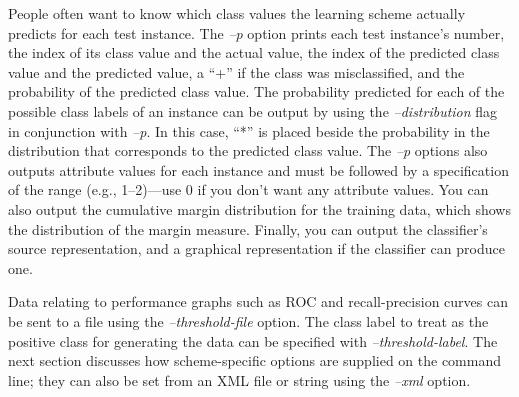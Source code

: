 People often want to know which class values the learning scheme
actually predicts for each test instance. The \textit{--p} option
prints each test instance’s number, the index of its class value and
the actual value, the index of the predicted class value and the
predicted value, a ``+'' if the class was misclassified, and the
probability of the predicted class value. The probability predicted
for each of the possible class labels of an instance can be output by
using the \textit{--distribution} flag in conjunction
with \textit{--p}. In this case, ``*'' is placed beside the
probability in the distribution that corresponds to the predicted
class value. The \textit{--p} options also outputs attribute values
for each instance and must be followed by a specification of the range
(e.g., 1--2)---use 0 if you don't want any attribute values. You can
also output the cumulative margin distribution for the training data,
which shows the distribution of the margin measure. Finally, you can
output the classifier's source representation, and a graphical
representation if the classifier can produce one.

Data relating to performance graphs such as ROC and recall-precision
curves can be sent to a file using the \textit{--threshold-file}
option. The class label to treat as the positive class for generating
the data can be specified with \textit{--threshold-label}. The next
section discusses how scheme-specific options are supplied on the
command line; they can also be set from an XML file or string using
the \textit{--xml} option.

